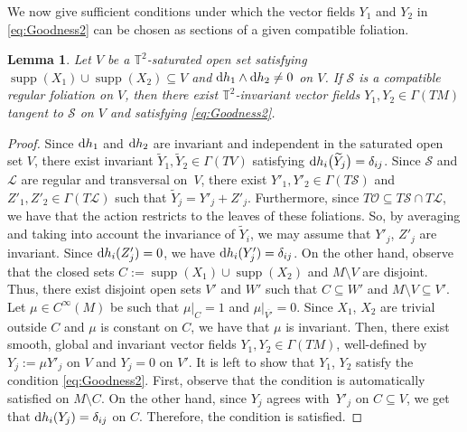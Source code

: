 \documentclass[10pt,a4paper]{amsart}
\newcommand{\dd}{{\rm d}}
\numberwithin{equation}{section}
\newtheorem{Lemma}[Theorem]{Lemma}
\begin{document}
We now give sufficient conditions under which the vector fields $Y_{1}$ and $Y_{2}$ in \eqref{eq:Goodness2} can be chosen as sections of a given compatible foliation.

\begin{Lemma}\label{lemma:Compat}
Let $V$ be a $\mathbb{T}^{2}$-saturated open set satisfying $\operatorname{supp}(X_1) \cup \operatorname{supp}(X_2) \subseteq V$ and $\dd h_1 \wedge \dd h_2 \neq 0$ on $V$. If $\mathcal{S}$ is a compatible regular foliation on $V$, then there exist $\mathbb{T}^{2}$-invariant vector fields $Y_1, Y_{2} \in \Gamma(TM)$ tangent to $\mathcal{S}$ on $V$ and satisfying \eqref{eq:Goodness2}.
\end{Lemma}
\begin{proof}
Since $\dd h_{1}$ and $\dd h_{2}$ are invariant and independent in the saturated open set $V$, there exist invariant $\widetilde{Y}_{1},\widetilde{Y}_{2} \in \Gamma(TV)$ satisfying $\dd h_{i}\big(\widetilde{Y}_{j}\big) = \delta_{ij}$. Since $\mathcal{S}$ and $\mathcal{L}$ are regular and transversal on~$V$, there exist $Y'_1,Y'_2 \in \Gamma(T\mathcal{S})$ and $Z'_1,Z'_2 \in \Gamma(T\mathcal{L})$ such that $\widetilde{Y}_{j} = Y'_{j} + Z'_{j}$. Furthermore, since $T\mathcal{O} \subseteq T\mathcal{S} \cap T\mathcal{L}$, we have that the action restricts to the leaves of these foliations. So, by averaging and taking into account the invariance of $\widetilde{Y}_{i}$, we may assume that $Y'_{j}$, $Z'_{j}$ are invariant. Since $\dd h_{i}(Z'_{j})=0$, we have $\dd h_{i}(Y'_{j}) = \delta_{ij}$. On the other hand, observe that the closed sets $C := \operatorname{supp}(X_1) \cup \operatorname{supp}(X_2)$ and $M \setminus V$ are disjoint. Thus, there exist disjoint open sets $V'$ and $W'$ such that $C \subseteq W'$ and $M \setminus V \subseteq V'$. Let $\mu \in C^{\infty}(M)$ be such that $\mu|_{C} = 1$ and $\mu|_{\overline{V'}} = 0$. Since $X_1$, $X_2$ are trivial outside $C$ and $\mu$ is constant on $C$, we have that $\mu$ is invariant. Then, there exist smooth, global and invariant vector fields $Y_1,Y_2 \in \Gamma(TM)$, well-defined by $Y_{j} := \mu Y'_{j}$ on $V$ and $Y_{j} = 0$ on $V'$. It is left to show that $Y_1$, $Y_2$ satisfy the condition \eqref{eq:Goodness2}. First, observe that the condition is automatically satisfied on $M \setminus C$. On the other hand, since $Y_{j}$ agrees with~$Y'_{j}$ on $C \subseteq V$, we get that $\dd h_{i}(Y_{j}) = \delta_{ij}$ on $C$. Therefore, the condition is satisfied.
\end{proof}
\end{document}
